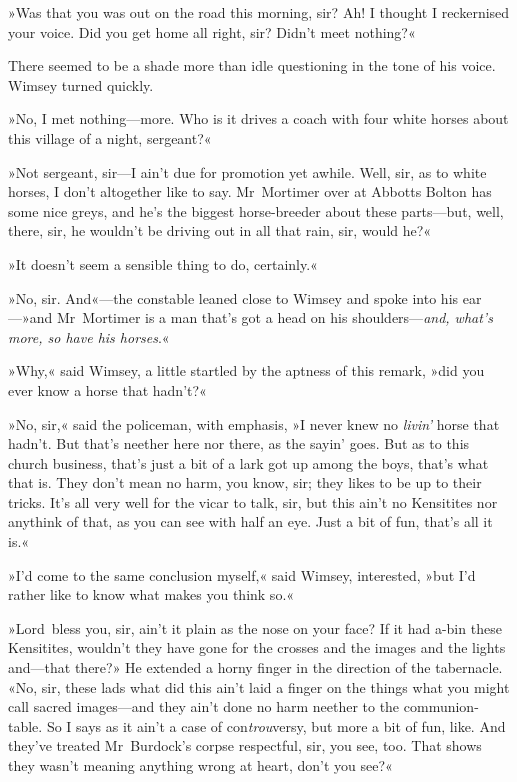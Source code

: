 »Was that you was out on the road this morning, sir? Ah! I thought I reckernised your voice. Did you get home all right, sir? Didn't meet nothing?«

There seemed to be a shade more than idle questioning in the tone of his voice. Wimsey turned quickly.

»No, I met nothing—more. Who is it drives a coach with four white horses about this village of a night, sergeant?«

»Not sergeant, sir—I ain't due for promotion yet awhile. Well, sir, as to white horses, I don't altogether like to say. Mr~Mortimer over at Abbotts Bolton has some nice greys, and he's the biggest horse-breeder about these parts—but, well, there, sir, he wouldn't be driving out in all that rain, sir, would he?«

»It doesn't seem a sensible thing to do, certainly.«

»No, sir. And«—the constable leaned close to Wimsey and spoke into his ear—»and Mr~Mortimer is a man that's got a head on his shoulders—\textit{and, what's more, so have his horses}.«

»Why,« said Wimsey, a little startled by the aptness of this remark, »did you ever know a horse that hadn't?«

»No, sir,« said the policeman, with emphasis, »I never knew no \textit{livin'} horse that hadn't. But that's neether here nor there, as the sayin' goes. But as to this church business, that's just a bit of a lark got up among the boys, that's what that is. They don't mean no harm, you know, sir; they likes to be up to their tricks. It's all very well for the vicar to talk, sir, but this ain't no Kensitites nor anythink of that, as you can see with half an eye. Just a bit of fun, that's all it is.«

»I'd come to the same conclusion myself,« said Wimsey, interested, »but I'd rather like to know what makes you think so.«

»Lord~bless you, sir, ain't it plain as the nose on your face? If it had a-bin these Kensitites, wouldn't they have gone for the crosses and the images and the lights and—that there?» He extended a horny finger in the direction of the tabernacle. «No, sir, these lads what did this ain't laid a finger on the things what you might call sacred images—and they ain't done no harm neether to the communion-table. So I says as it ain't a case of con\textit{trou}versy, but more a bit of fun, like. And they've treated Mr~Burdock's corpse respectful, sir, you see, too. That shows they wasn't meaning anything wrong at heart, don't you see?«

